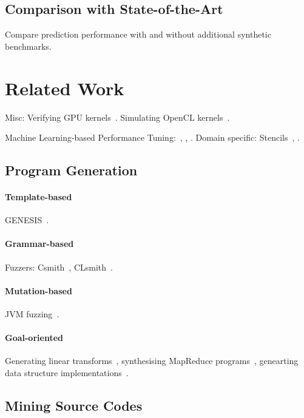 \documentclass[preprint,nonatbib,10pt,nocopyrightspace]{sigplanconf}
\begin{document}
\subsection{Comparison with State-of-the-Art}\label{subsec:}

Compare prediction performance with and without additional synthetic
benchmarks.


\section{Related Work}\label{sec:related-work}

Misc: Verifying GPU kernels~\cite{Betts2012}. Simulating OpenCL
kernels~\cite{Price2015}.

Machine Learning-based Performance Tuning:~\cite{Wen2015},
\cite{Magni2014}, \cite{Falch2015}. Domain specific:
Stencils~\cite{Garvey2015b}, \cite{Cummins2015a}.


\subsection{Program Generation}


\paragraph{Template-based} GENESIS~\cite{Chiu2015}.


\paragraph{Grammar-based} Fuzzers:
Csmith~\cite{Yang2012}, CLsmith~\cite{Pflanzer2016}.


\paragraph{Mutation-based} JVM fuzzing~\cite{Chena}.


\paragraph{Goal-oriented} Generating linear
transforms~\cite{Voronenko2009}, synthesising MapReduce
programs~\cite{Smith}, genearting data structure
implementations~\cite{Loncaric2016}.


\subsection{Mining Source Codes}
\end{document}
